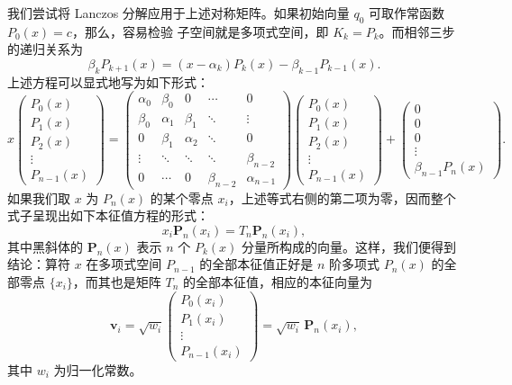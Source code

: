 我们尝试将 Lanczos 分解应用于上述对称矩阵。如果初始向量 $q_0$ 可取作常函数 $P_0(x)=c$，那么，容易检验  子空间就是多项式空间，即 $K_k=P_k$。而相邻三步的递归关系为
\begin{equation}
\beta_kP_{k+1}(x)=(x-\alpha_k)P_k(x)-\beta_{k-1}P_{k-1}(x).
\tag{3.5.29}
\end{equation}
上述方程可以显式地写为如下形式：
\begin{equation}
x
\begin{pmatrix}
P_0(x)\\P_1(x)\\P_2(x)\\\vdots\\P_{n-1}(x)
\end{pmatrix}
=
\begin{pmatrix}
\alpha_0&\beta_0&0&\cdots&0\\
\beta_0&\alpha_1&\beta_1&\ddots&\vdots\\
0&\beta_1&\alpha_2&\ddots&0\\
\vdots&\ddots&\ddots&\ddots&\beta_{n-2}\\
0&\cdots&0&\beta_{n-2}&\alpha_{n-1}
\end{pmatrix}
\begin{pmatrix}
P_0(x)\\P_1(x)\\P_2(x)\\\vdots\\P_{n-1}(x)
\end{pmatrix}
+
\begin{pmatrix}0\\0\\0\\\vdots\\\beta_{n-1}P_n(x)\end{pmatrix}.
\tag{3.5.30}
\end{equation}
如果我们取 $x$ 为 $P_n(x)$ 的某个零点 $x_i$，上述等式右侧的第二项为零，因而整个式子呈现出如下本征值方程的形式：
\begin{equation}
x_i\bm P_n(x_i)=T_n\bm P_n(x_i),
\tag{3.5.31}
\end{equation}
其中黑斜体的 $\bm P_n(x)$ 表示 $n$ 个 $P_k(x)$ 分量所构成的向量。这样，我们便得到结论：算符 $x$ 在多项式空间 $P_{n-1}$ 的全部本征值正好是 $n$ 阶多项式 $P_n(x)$ 的全部零点 $\{x_i\}$，而其也是矩阵 $T_n$ 的全部本征值，相应的本征向量为
\begin{equation}
\bm v_i=\sqrt{w_i}
\begin{pmatrix}
P_0(x_i)\\P_1(x_i)\\\vdots\\P_{n-1}(x_i)
\end{pmatrix}
=\sqrt{w_i}\,\bm P_n(x_i),
\tag{3.5.32}
\end{equation}
其中 $w_i$ 为归一化常数。

